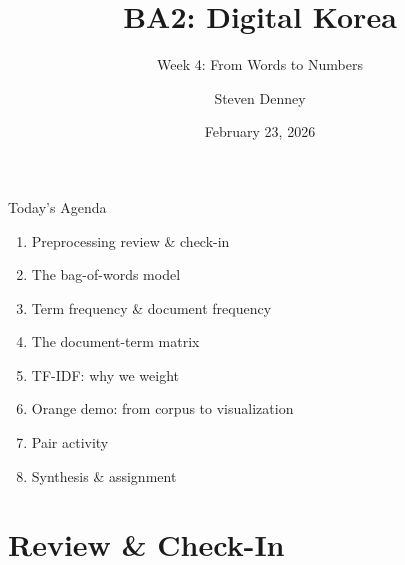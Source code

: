 \documentclass[aspectratio=169,11pt]{beamer}
\title{BA2: Digital Korea}
\subtitle{Week 4: From Words to Numbers}
\author{Steven Denney}
\institute{Korean Studies \\ Leiden University}
\date{February 23, 2026}
\begin{document}
\begin{frame}
    \titlepage
\end{frame}

\begin{frame}{Today's Agenda}
    \begin{enumerate}
        \item Preprocessing review \& check-in
        \item The bag-of-words model
        \item Term frequency \& document frequency
        \item The document-term matrix
        \item TF-IDF: why we weight
        \item Orange demo: from corpus to visualization
        \item Pair activity
        \item Synthesis \& assignment
    \end{enumerate}
\end{frame}

\section{Review \& Check-In}
\end{document}
